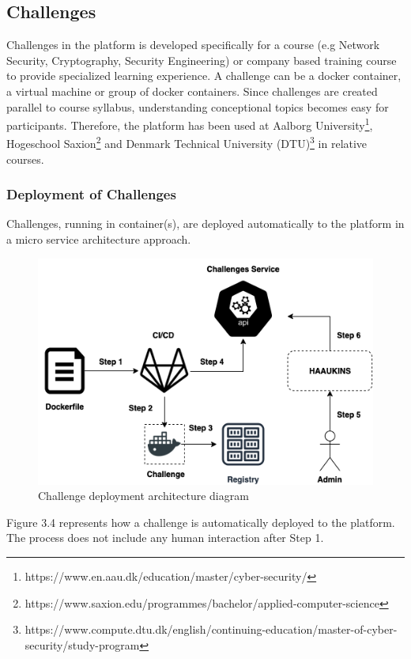 \subsection{Challenges}

Challenges in the platform is developed specifically for a course (e.g Network Security, Cryptography, Security Engineering) or company based training course to provide specialized learning experience. A challenge can be a docker container, a virtual machine or group of docker containers. Since challenges are created parallel to course syllabus, understanding conceptional topics becomes easy for participants. Therefore, the platform has been used at Aalborg University\footnote{https://www.en.aau.dk/education/master/cyber-security/},  Hogeschool Saxion\footnote{https://www.saxion.edu/programmes/bachelor/applied-computer-science} and Denmark Technical University (DTU)\footnote{https://www.compute.dtu.dk/english/continuing-education/master-of-cyber-security/study-program} in relative courses. 

\subsubsection{Deployment of Challenges}

Challenges, running in container(s), are deployed automatically to the platform in a micro service architecture approach. 

\begin{figure}[htbp]
\centerline{\includegraphics[scale=.6]{figures/challenge-deployment.png}}
\caption{Challenge deployment architecture diagram }
\label{fig}
\end{figure}
\newpage 
Figure 3.4 represents how a challenge is automatically deployed to the platform. The process does not include any human interaction after Step 1. 

